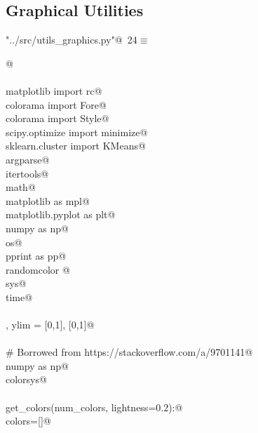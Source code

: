 \documentclass[12.0pt]{report}
\begin{document}
\begin{appendices}
\section{Graphical Utilities}


\begin{flushleft} \small\label{scrap11}\raggedright\small
{} \verb@"../src/utils_graphics.py"@\nobreak\ {\footnotesize {24}}$\equiv$
\vspace{-1ex}
\begin{list}{}{} \item
\mbox{}\verb@    @\\
\mbox{}\verb@@\\
\mbox{}\verb@from matplotlib import rc@\\
\mbox{}\verb@from colorama import Fore@\\
\mbox{}\verb@from colorama import Style@\\
\mbox{}\verb@from scipy.optimize import minimize@\\
\mbox{}\verb@from sklearn.cluster import KMeans@\\
\mbox{}\verb@import argparse@\\
\mbox{}\verb@import itertools@\\
\mbox{}\verb@import math@\\
\mbox{}\verb@import matplotlib as mpl@\\
\mbox{}\verb@import matplotlib.pyplot as plt@\\
\mbox{}\verb@import numpy as np@\\
\mbox{}\verb@import os@\\
\mbox{}\verb@import pprint as pp@\\
\mbox{}\verb@import randomcolor @\\
\mbox{}\verb@import sys@\\
\mbox{}\verb@import time@\\
\mbox{}\verb@@\\
\mbox{}\verb@xlim, ylim = [0,1], [0,1]@\\
\mbox{}\verb@@\\
\mbox{}\verb@# Borrowed from https://stackoverflow.com/a/9701141@\\
\mbox{}\verb@import numpy as np@\\
\mbox{}\verb@import colorsys@\\
\mbox{}\verb@@\\
\mbox{}\verb@def get_colors(num_colors, lightness=0.2):@\\
\mbox{}\verb@    colors=[]@\\

\end{list}
\end{flushleft}
\end{appendices}
\end{document}
